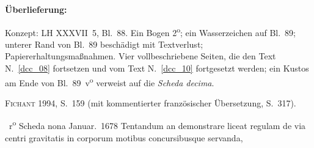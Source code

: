 %
%
%
%
%
\frenchspacing%
%
\begin{ledgroupsized}[r]{120mm}%
\footnotesize%
\pstart%
\noindent%
\textbf{Überlieferung:}%
\pend%
\end{ledgroupsized}%
\begin{ledgroupsized}[r]{114mm}%
\footnotesize%
\pstart%
\parindent -6mm%
%
Konzept:
LH XXXVII~5, Bl.~88.
Ein Bogen 2\textsuperscript{o};
ein Wasserzeichen auf Bl.~89;
unterer Rand von Bl.~89 beschädigt mit Textverlust;
Papiererhaltungsmaßnahmen.
Vier vollbeschriebene Seiten,
die den Text N.~\ref{dcc_08} %
fortsetzen und vom Text N.~\ref{dcc_10} %
fortgesetzt werden;
ein Kustos am Ende von Bl.~89~v\textsuperscript{o}\! verweist auf die \textit{Scheda decima}.
\pend%
%
\end{ledgroupsized}%
\begin{ledgroupsized}[r]{114mm}%
\footnotesize%
\pstart%
\parindent -6mm%
%
\textsc{Fichant} 1994, S.~159 (mit kommentierter französischer Übersetzung, S.~317).%
\cite{01056}
\pend%
\end{ledgroupsized}%
%
%
\frenchspacing%
%
%
\vspace{8mm}
\normalsize%
\count{}%
\count{}%
\count{}
\pstart%
\noindent%
%
~r\textsuperscript{o}\rbrack%
\hspace{47mm}
Scheda nona%
\protect{}%
\hspace{38mm}
Januar.\ 1678%
\pend%
\vspace{0.5em}%
%
\pstart%
\noindent%
Tentandum%
an demonstrare liceat regulam de via centri gravitatis%
\protect{}
in corporum motibus concursibusque servanda,%
